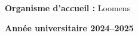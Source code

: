 \begin{titlepage}
\begin{center}
\vspace{1.5cm}

\textbf{Organisme d'accueil :} Loomens

\vspace{1cm}

{\large \textbf{Année universitaire 2024--2025}}

\end{center}
\end{titlepage}

\newpage
\thispagestyle{empty}
\mbox{}
\newpage
